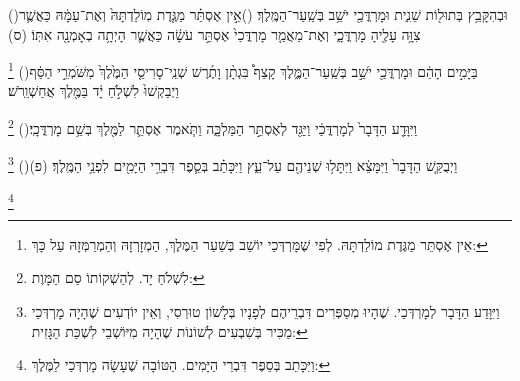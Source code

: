 \documentclass[12pt, openany]{book}
\newcommand{\footnotecomment}[1]{
	\renewcommand\thefootnote{}
	\footnote{#1}}
\newcommand{\commenta}[1]{\footnotecomment{#1}\hspace{0em}}
\newcommand{\vsnum}[1]{(\hebrewnumeral{#1})\space}
\begin{document}
{\vsnum{19}וּבְהִקָּבֵ֥ץ בְּתוּל֖וֹת שֵׁנִ֑ית וּמָרְדֳּכַ֖י יֹשֵׁ֥ב בְּשַֽׁעַר־הַמֶּֽלֶךְ׃
\vsnum{20}אֵ֣ין אֶסְתֵּ֗ר מַגֶּ֤דֶת מֽוֹלַדְתָּהּ֙ וְאֶת־עַמָּ֔הּ כַּאֲשֶׁ֛ר צִוָּ֥ה עָלֶ֖יהָ מָרְדֳּכָ֑י וְאֶת־מַאֲמַ֤ר מָרְדֳּכַי֙ אֶסְתֵּ֣ר עֹשָׂ֔ה כַּאֲשֶׁ֛ר הָיְתָ֥ה בְאָמְנָ֖ה אִתּֽוֹ׃ (ס)%
\commenta{אֵין אֶסְתֵּר מַגֶּדֶת מוֹלַדְתָּהּ. לְפִי שֶׁמָּרְדְּכַי יוֹשֵׁב בְּשַׁעַר הַמֶּלֶךְ, הַמְזָרְזָהּ וְהַמְרַמְּזָהּ עַל כָּךְ: }%
\vsnum{21}בַּיָּמִ֣ים הָהֵ֔ם וּמָרְדֳּכַ֖י יֹשֵׁ֣ב בְּשַֽׁעַר־הַמֶּ֑לֶךְ קָצַף֩ בִּגְתָ֨ן וָתֶ֜רֶשׁ שְׁנֵֽי־סָרִיסֵ֤י הַמֶּ֙לֶךְ֙ מִשֹּׁמְרֵ֣י הַסַּ֔ף וַיְבַקְשׁוּ֙ לִשְׁלֹ֣חַ יָ֔ד בַּמֶּ֖לֶךְ אֲחַשְׁוֵֽרֹשׁ׃%
\commenta{לִשְׁלֹחַ יָד. לְהַשְׁקוֹתוֹ סַם הַמָּוֶת:}%
\vsnum{22}וַיִּוָּדַ֤ע הַדָּבָר֙ לְמָרְדֳּכַ֔י וַיַּגֵּ֖ד לְאֶסְתֵּ֣ר הַמַּלְכָּ֑ה וַתֹּ֧אמֶר אֶסְתֵּ֛ר לַמֶּ֖לֶךְ בְּשֵׁ֥ם מָרְדֳּכָֽי׃%
\commenta{וַיִּוָּדַע הַדָּבָר לְמָרְדְּכַי. שֶׁהָיוּ מְסַפְּרִים דִּבְרֵיהֶם לְפָנָיו בְּלָשׁוֹן טוּרְסִי, וְאֵין יוֹדְעִים שֶׁהָיָה מָרְדְּכַי מַכִּיר בְּשִׁבְעִים לְשׁוֹנוֹת שֶׁהָיָה מִיּוֹשְׁבֵי לִשְׁכַּת הַגָּזִית: }%
\vsnum{23}וַיְבֻקַּ֤שׁ הַדָּבָר֙ וַיִּמָּצֵ֔א וַיִּתָּל֥וּ שְׁנֵיהֶ֖ם עַל־עֵ֑ץ וַיִּכָּתֵ֗ב בְּסֵ֛פֶר דִּבְרֵ֥י הַיָּמִ֖ים לִפְנֵ֥י הַמֶּֽלֶךְ׃ (פ)%
\commenta{וַיִּכָּתֵב בְּסֵפֶר דִּבְרֵי הַיָּמִים. הַטּוֹבָה שֶׁעָשָׂה מָרְדְּכַי לַמֶּלֶךְ:}%
\clearpage}
\end{document}
